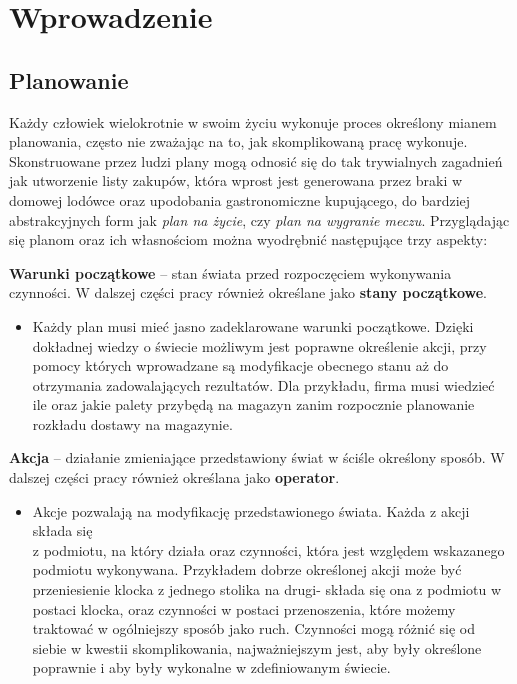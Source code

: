 \chapter{Wprowadzenie}
\thispagestyle{chapterBeginStyle}
\label{rozdzial1}
\section{Planowanie}

    Każdy człowiek wielokrotnie w swoim życiu wykonuje proces określony mianem planowania, często nie zważając na to, jak skomplikowaną pracę wykonuje.
    Skonstruowane przez ludzi plany mogą odnosić się do tak trywialnych zagadnień jak utworzenie listy zakupów, która wprost jest generowana przez braki
    w domowej lodówce oraz upodobania gastronomiczne kupującego, do bardziej abstrakcyjnych form jak \textit{plan na życie}, czy \textit{plan na wygranie meczu}.
    Przyglądając się planom oraz ich własnościom można wyodrębnić następujące trzy aspekty:
    \begin{definition}
    \label{StanyPoczatkowe}
        \textbf{Warunki początkowe} -- stan świata przed rozpoczęciem wykonywania czynności. W dalszej części pracy również określane jako 
        \textbf{stany początkowe}.
    \end{definition}
    \begin{itemize}
        \item Każdy plan musi mieć jasno zadeklarowane warunki początkowe.
        Dzięki dokładnej wiedzy o świecie możliwym jest poprawne określenie akcji, przy pomocy których wprowadzane są modyfikacje
        obecnego stanu aż do otrzymania zadowalających rezultatów. Dla przykładu, firma musi wiedzieć ile oraz jakie palety 
        przybędą na magazyn zanim rozpocznie planowanie rozkładu dostawy na magazynie.
    \end{itemize}
    \begin{definition}
    \label{Akcje}
        \textbf{Akcja} -- działanie zmieniające przedstawiony świat w ściśle określony sposób. W dalszej części pracy również określana jako
        \textbf{operator}.
    \end{definition}
    \begin{itemize}
        \item Akcje pozwalają na modyfikację przedstawionego świata. Każda z akcji składa się \\
        z podmiotu, na który działa oraz czynności,
        która jest względem wskazanego podmiotu wykonywana. Przykładem dobrze określonej akcji może być przeniesienie klocka z 
        jednego stolika na drugi- składa się ona z podmiotu w postaci klocka, oraz czynności w postaci przenoszenia, które możemy traktować
        w ogólniejszy sposób jako ruch. Czynności mogą różnić się od siebie w kwestii skomplikowania, najważniejszym jest, aby były określone poprawnie i aby były wykonalne
        w zdefiniowanym świecie.
    \end{itemize}
